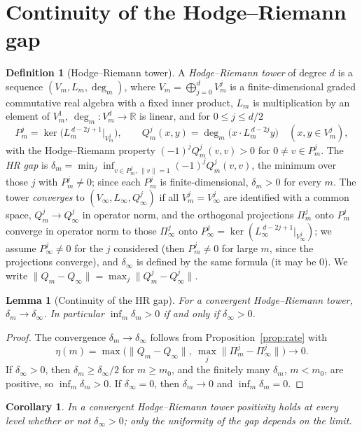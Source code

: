 \documentclass[11pt]{amsart}
\newtheorem{lemma}[theorem]{Lemma}
\newtheorem{corollary}[theorem]{Corollary}
\theoremstyle{definition}
\newtheorem{definition}[theorem]{Definition}
\theoremstyle{remark}
\begin{document}
\section{Continuity of the Hodge--Riemann gap}
\begin{definition}[Hodge--Riemann tower]
A \emph{Hodge--Riemann tower} of degree $d$ is a sequence $(V_m,L_m,\deg_m)$, where
$V_m=\bigoplus_{j=0}^dV_m^j$ is a finite-dimensional graded commutative real
algebra with a fixed inner product, $L_m$ is multiplication by an element of
$V_m^1$,
$\deg_m\colon V_m^d\to\mathbb R$ is linear, and for $0\le j\le d/2$
\[
P_m^j=\ker\bigl(L_m^{\,d-2j+1}|_{V_m^j}\bigr),\qquad
Q_m^j(x,y)=\deg_m\bigl(x\cdot L_m^{\,d-2j}y\bigr)\quad(x,y\in V_m^j),
\]
with the Hodge--Riemann property $(-1)^jQ_m^j(v,v)>0$ for $0\ne v\in P_m^j$. The
\emph{HR gap} is $\delta_m=\min_j\inf_{v\in P_m^j,\,\|v\|=1}(-1)^jQ_m^j(v,v)$,
the minimum over those $j$ with $P_m^j\ne0$; since
each $P_m^j$ is finite-dimensional, $\delta_m>0$ for every $m$. The tower
\emph{converges} to $(V_\infty,L_\infty,Q_\infty^j)$ if all $V_m^j=V_\infty^j$ are
identified with a common space, $Q_m^j\to Q_\infty^j$ in operator norm, and the
orthogonal projections $\Pi_m^j$ onto $P_m^j$ converge in operator norm to those
$\Pi_\infty^j$ onto $P_\infty^j=\ker(L_\infty^{\,d-2j+1}|_{V_\infty^j})$; we
assume $P_\infty^j\ne0$ for the $j$ considered (then $P_m^j\ne0$ for large $m$,
since the projections converge), and $\delta_\infty$ is defined by the same
formula (it may be $0$). We write $\|Q_m-Q_\infty\|=\max_j\|Q_m^j-Q_\infty^j\|$.
\end{definition}

\begin{lemma}[Continuity of the HR gap]\label{thm:hr}
For a convergent Hodge--Riemann tower, $\delta_m\to\delta_\infty$. In particular
$\inf_m\delta_m>0$ if and only if $\delta_\infty>0$.
\end{lemma}
\begin{proof}
The convergence $\delta_m\to\delta_\infty$ follows from
Proposition~\ref{prop:rate} with
\[\eta(m)=\max\bigl(\|Q_m-Q_\infty\|,\ \max_j\|\Pi_m^j-\Pi_\infty^j\|\bigr)\to0.\] If $\delta_\infty>0$, then
$\delta_m\ge\delta_\infty/2$ for $m\ge m_0$, and the finitely many
$\delta_m$, $m<m_0$, are positive, so $\inf_m\delta_m>0$. If $\delta_\infty=0$,
then $\delta_m\to0$ and $\inf_m\delta_m=0$.
\end{proof}

\begin{corollary}\label{cor:towerbridge}
In a convergent Hodge--Riemann tower positivity holds at every level whether or
not $\delta_\infty>0$; only the uniformity of the gap depends on the limit.
\end{corollary}
\end{document}
